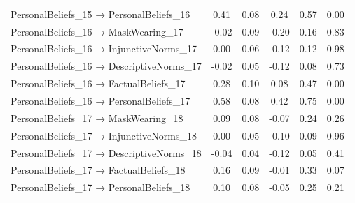 \documentclass[
  man, donotrepeattitle,floatsintext]{apa6}
\begin{document}
\begin{center}
\begin{ThreePartTable}
{\begin{longtable}{lccccc}
PersonalBeliefs\_15 → PersonalBeliefs\_16 & 0.41 & 0.08 & 0.24 & 0.57 & 0.00\\
PersonalBeliefs\_16 → MaskWearing\_17 & -0.02 & 0.09 & -0.20 & 0.16 & 0.83\\
PersonalBeliefs\_16 → InjunctiveNorms\_17 & 0.00 & 0.06 & -0.12 & 0.12 & 0.98\\
PersonalBeliefs\_16 → DescriptiveNorms\_17 & -0.02 & 0.05 & -0.12 & 0.08 & 0.73\\
PersonalBeliefs\_16 → FactualBeliefs\_17 & 0.28 & 0.10 & 0.08 & 0.47 & 0.00\\
PersonalBeliefs\_16 → PersonalBeliefs\_17 & 0.58 & 0.08 & 0.42 & 0.75 & 0.00\\
PersonalBeliefs\_17 → MaskWearing\_18 & 0.09 & 0.08 & -0.07 & 0.24 & 0.26\\
PersonalBeliefs\_17 → InjunctiveNorms\_18 & 0.00 & 0.05 & -0.10 & 0.09 & 0.96\\
PersonalBeliefs\_17 → DescriptiveNorms\_18 & -0.04 & 0.04 & -0.12 & 0.05 & 0.41\\
PersonalBeliefs\_17 → FactualBeliefs\_18 & 0.16 & 0.09 & -0.01 & 0.33 & 0.07\\
PersonalBeliefs\_17 → PersonalBeliefs\_18 & 0.10 & 0.08 & -0.05 & 0.25 & 0.21\\
\bottomrule
\end{longtable}

}

\end{ThreePartTable}
\end{center}

\newpage
\end{document}
